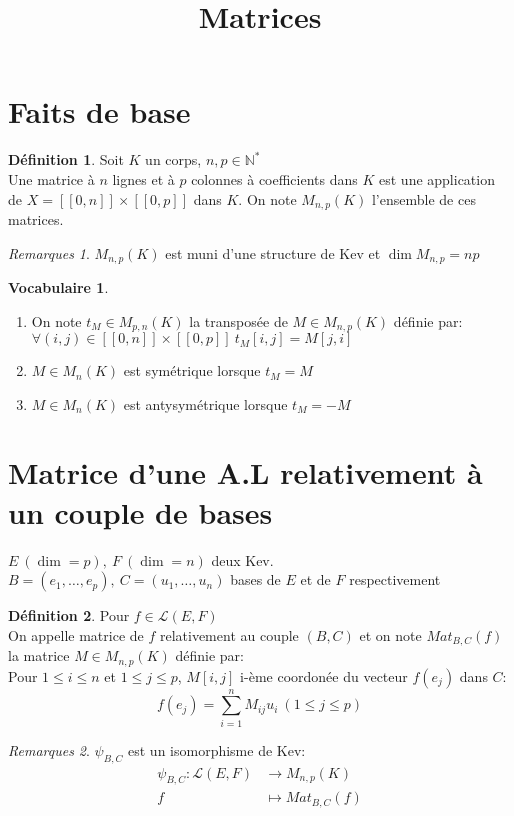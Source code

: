 \documentclass[fleqn]{article}
\title{Matrices}
\date{}
\theoremstyle{definition} \newtheorem*{defi}{D\'efinition}
\theoremstyle{definition} \newtheorem*{theo}{Th\'eor\`eme}
\theoremstyle{definition} \newtheorem*{coro}{Corollaire}
\theoremstyle{definition} \newtheorem*{nota}{Notation}
\theoremstyle{definition} \newtheorem*{vocab}{Vocabulaire}
\theoremstyle{remark} \newtheorem*{rqs}{Remarques}
\theoremstyle{definition} \newtheorem*{prop}{Propri\'et\'e}
\begin{document}
\maketitle

\section{Faits de base}
\begin{defi} Soit $K$ un corps, $n,p \in \mathbb{N}^*$\\
	Une matrice \`a $n$ lignes et \`a $p$ colonnes \`a coefficients dans $K$ est une application de $X = [\![0,n]\!]\times[\![0,p]\!]$ dans
	$K$. On note $M_{n,p}(K)$ l'ensemble de ces matrices.

	\begin{rqs} $M_{n,p}(K)$ est muni d'une structure de Kev et $\dim M_{n,p} = np$
	\end{rqs}
\end{defi}

\begin{vocab} $ $
	\begin{enumerate}
		\item On note $t_M \in M_{p,n}(K)$ la transpos\'ee de $M \in M_{n,p}(K)$ d\'efinie par: $\forall (i,j) \in
		[\![0,n]\!]\times[\![0,p]\!]\ t_M[i,j] = M[j,i]$
		\item $M \in M_n(K)$ est sym\'etrique lorsque $t_M = M$
		\item $M \in M_n(K)$ est antysym\'etrique lorsque $t_M = -M$
	\end{enumerate}
\end{vocab}

\section{Matrice d'une A.L relativement à un couple de bases}
$E\ (\dim = p),\ F\ (\dim = n)$ deux Kev.\\ $B = (e_1, \hdots, e_p),\ C = (u_1, \hdots, u_n)$ bases de $E$ et de $F$ respectivement
\begin{defi} Pour $f \in \mathscr{L}(E,F)$\\
	On appelle matrice de $f$ relativement au couple $(B,C)$ et on note $Mat_{B,C}(f)$ la matrice $M \in M_{n,p}(K)$ d\'efinie par:\\
	Pour $1 \leq i \leq n$ et $1 \leq j \leq p$, $M[i,j]$ i-\`eme coordon\'ee du vecteur $f(e_j)$ dans $C$: \\
	\[f(e_j) = \sum_{i=1}^n M_{ij} u_i\ (1\leq j \leq p)\]

\begin{rqs} $\psi_{B,C}$ est un isomorphisme de Kev:
	\begin{align*}
		\psi_{B,C}: \mathscr{L}(E,F) &\rightarrow M_{n,p}(K)\\
		f & \mapsto Mat_{B,C}(f)
	\end{align*}
\end{rqs}
\end{defi}
\end{document}
